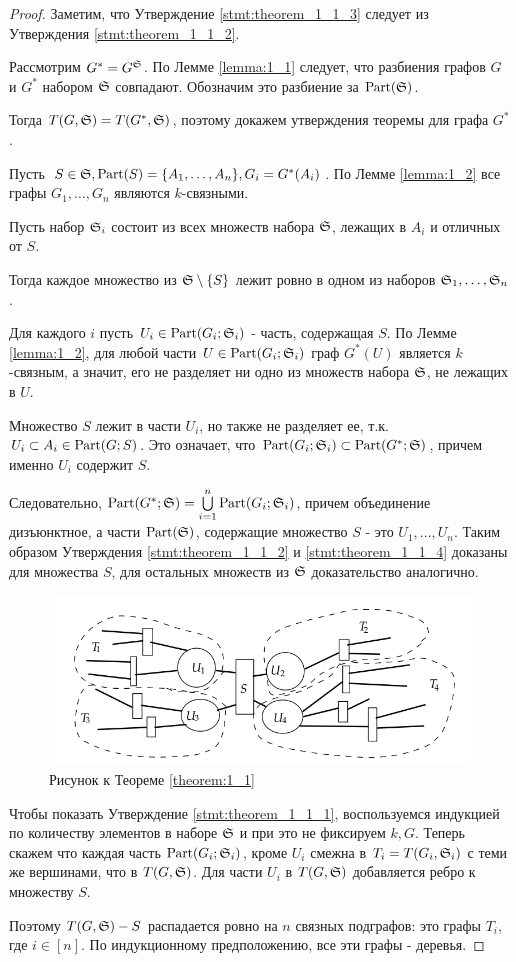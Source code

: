 \documentclass[../main.tex]{subfiles}
\begin{document}
\begin{proof}
	Заметим, что Утверждение \eqref{stmt:theorem_1_1_3} следует из Утверждения \eqref{stmt:theorem_1_1_2}.

	Рассмотрим  $G^* = G^\S$.
	По Лемме \ref{lemma:1_1} следует, что разбиения графов  $G$ и  $G^*$ набором  $\S$ совпадают. Обозначим это разбиение за  $\Part(\S)$.

	Тогда  $T(G, \S) = T(G^*, \S)$, поэтому докажем утверждения теоремы для графа  $G^*$.

	Пусть $S \in \S, \Part(S) = \{A_1, \ldots, A_n\}, G_i = G^*(A_i)$.
	По Лемме \ref{lemma:1_2} все графы $G_1, \ldots, G_n$ являются  $k$-связными.

	Пусть набор  $\S_i$ состоит из всех множеств набора  $\S$, лежащих в  $A_i$ и отличных от  $S$.

	Тогда каждое множество из  $\S \setminus \{S\}$ лежит ровно в одном из наборов $\S_1, \ldots, \S_n$.

	Для каждого $i$ пусть $U_i \in \Part(G_i;\S_i)$ - часть, содержащая  $S$.
	По Лемме \ref{lemma:1_2}, для любой части $U \in \Part(G_i;\S_i)$ граф $G^*(U)$ является  $k$-связным, а значит, его не разделяет ни одно из множеств набора  $\S$, не лежащих в  $U$. 

	Множество $S$ лежит в части  $U_i$, но также не разделяет ее, т.к. $U_i \subset A_i \in \Part(G;S)$.
	Это означает, что  $\Part(G_i;\S_i) \subset \Part(G^*; \S)$, причем именно  $U_i$ содержит  $S$.

	Следовательно, $\Part(G^*; \S) = \bigcup\limits_{i=1}^n \Part(G_i;\S_i)$, причем объединение дизъюнктное, а части  $\Part(\S)$, содержащие множество  $S$ - это  $U_1, \ldots, U_n$.
	Таким образом Утверждения \eqref{stmt:theorem_1_1_2} и \eqref{stmt:theorem_1_1_4} доказаны для множества  $S$, для остальных множеств из  $\S$ доказательство аналогично.

\begin{figure}[ht]
    \centering
	\includegraphics[width=0.5\columnwidth]{figures/theorem_1_1.png}
    \caption{Рисунок к Теореме \ref{theorem:1_1}}
    \label{fig:theorem_1_1}
\end{figure}

	Чтобы показать Утверждение \eqref{stmt:theorem_1_1_1}, воспользуемся индукцией по количеству элементов в наборе $\S$ и при это не фиксируем  $k, G$.
	Теперь скажем что каждая часть $\Part(G_i; \S_i)$, кроме  $U_i$ смежна в  $T_i = T(G_i, \S_i)$ с теми же вершинами, что в  $T(G, \S)$.
	Для части  $U_i$ в  $T(G, \S)$ добавляется ребро к множеству  $S$.

	Поэтому  $T(G, \S) - S$ распадается ровно на  $n$ связных подграфов: это графы  $T_i$, где  $i \in [n]$.
	По индукционному предположению, все эти графы - деревья.

\end{proof}
\end{document}
